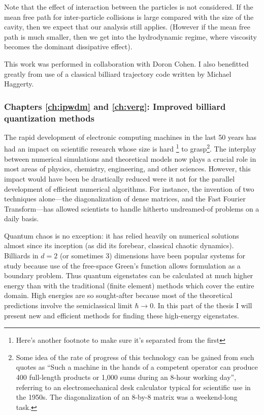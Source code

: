 Note that the effect of interaction between the particles is 
not considered. If the mean free path 
for inter-particle collisions is large compared 
with the size of the cavity, then we expect that our 
analysis still applies. (However if the mean free path is 
much smaller, then we get into the hydrodynamic regime, where viscosity
becomes the dominant dissipative effect).

This work was performed in collaboration with Doron Cohen.
I also benefitted greatly from use of a classical billiard trajectory code
written by Michael Haggerty.



\subsubsection{Chapters \ref{ch:ipwdm} and \ref{ch:verg}:
Improved billiard quantization methods}

The rapid development of electronic computing machines in the last 50 years
has had an impact on scientific research whose size is hard
\footnote{Here's another footnote to make sure it's separated from the first}
to
grasp\footnote{Some idea
of the rate of progress of this technology can be gained from such quotes as
``Such a machine in the hands of a competent operator can produce 400 full-length
products or 1,000 sums during an 8-hour working day''\cite{highspeed},
referring to an electromechanical desk calculator typical for scientific use in
the 1950s.
The diagonalization of an 8-by-8 matrix was a weekend-long task\cite{lanczos}.}.
The interplay between numerical simulations and theoretical models now plays a
crucial role in most areas of physics, chemistry, engineering, and other
sciences.
However, this impact would have been be drastically reduced were it not for
the parallel development of efficient numerical algorithms.
For instance, the invention of two techniques alone---the
diagonalization of dense matrices\cite{golub+vanloan},
and the Fast Fourier Transform\cite{numrec}---has allowed scientists
to handle hitherto undreamed-of problems on a daily basis.

Quantum chaos \cite{hellerleshouches} is no exception: it has relied heavily
on numerical solutions almost since its inception
(as did its forebear, classical chaotic dynamics\cite{ottbook}).
Billiards in $d=2$ (or sometimes 3) dimensions have been popular systems for
study because
use of the free-space Green's function allows formulation as a boundary problem.
Thus
quantum eigenstates can be calculated at much higher energy than with the
traditional (\eg finite element) methods which cover the entire domain.
High energies are so sought-after because most of the theoretical predictions
involve the semiclassical limit $\hbar\rightarrow0$.
In this part of the thesis I will present new and efficient
methods for finding these high-energy eigenstates.

